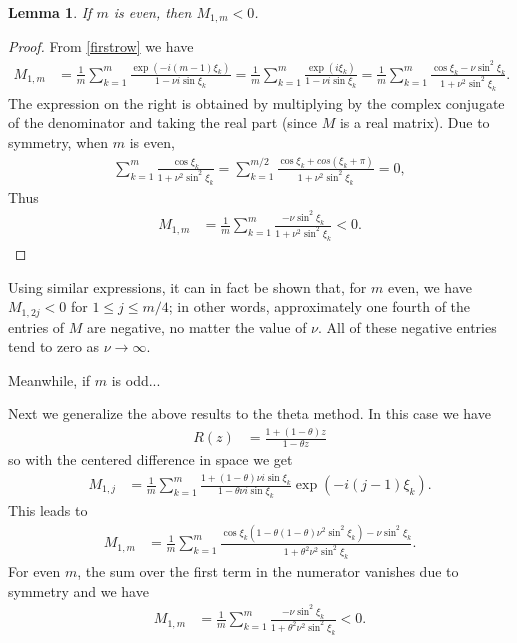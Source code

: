 \documentclass[a4paper]{article}
\newtheorem{lemma}{Lemma}
\begin{document}
\begin{lemma}
    If $m$ is even, then $M_{1,m} < 0$.
\end{lemma}
\begin{proof}
    From \eqref{firstrow} we have
    \begin{align}  \label{M12}
        M_{1,m} & = \frac{1}{m} \sum_{k=1}^m \frac{ \exp(-i(m-1)\xi_k)}{1-\nu i \sin\xi_k}
                  = \frac{1}{m} \sum_{k=1}^m \frac{ \exp(i\xi_k)}{1-\nu i \sin\xi_k}
                  = \frac{1}{m} \sum_{k=1}^m \frac{\cos \xi_k - \nu \sin^2 \xi_k}{1+\nu^2 \sin^2 \xi_k}.
    \end{align}
    The expression on the right is obtained by multiplying by the complex
    conjugate of the denominator and taking the real part (since $M$ is a real matrix).
    Due to symmetry, when $m$ is even,
    \begin{align*}
        \sum_{k=1}^m \frac{\cos \xi_k}{1+\nu^2\sin^2\xi_k}  = \sum_{k=1}^{m/2} \frac{\cos \xi_k + cos(\xi_k+\pi)}{1+\nu^2\sin^2\xi_k} = 0,
    \end{align*}
    Thus 
    \begin{align*} 
        M_{1,m} & = \frac{1}{m} \sum_{k=1}^m \frac{- \nu \sin^2 \xi_k}{1+\nu^2 \sin^2 \xi_k} < 0.
    \end{align*}
\end{proof}
Using similar expressions, it can in fact be shown that, for $m$ even, we have
$M_{1,2j}<0$ for $1\le j \le m/4$; in other words, approximately one fourth of
the entries of $M$ are negative, no matter the value of $\nu$.  All of these
negative entries tend to zero as $\nu \to \infty$.

Meanwhile, if $m$ is odd...


Next we generalize the above results to the theta method.  In this case we have
\begin{align}
    R(z) & = \frac{1+(1-\theta)z}{1-\theta z}
\end{align}
so with the centered difference in space we get
\begin{align} \label{firstrow-theta}
    M_{1,j} & = \frac{1}{m} \sum_{k=1}^m \frac{1+(1-\theta)\nu i\sin\xi_k}{1-\theta\nu i \sin\xi_k}\exp\left(-i(j-1)\xi_k\right).
\end{align}
This leads to
\begin{align*} 
    M_{1,m} & = \frac{1}{m} \sum_{k=1}^m \frac{\cos\xi_k(1-\theta(1-\theta)\nu^2\sin^2\xi_k)- \nu \sin^2 \xi_k}{1+\theta^2\nu^2 \sin^2 \xi_k}.
\end{align*}
For even $m$, the sum over the first term in the numerator vanishes due to symmetry and we have
\begin{align*}
    M_{1,m} & =  \frac{1}{m} \sum_{k=1}^m \frac{- \nu \sin^2 \xi_k}{1+\theta^2\nu^2 \sin^2 \xi_k} < 0.
\end{align*}
\end{document}
